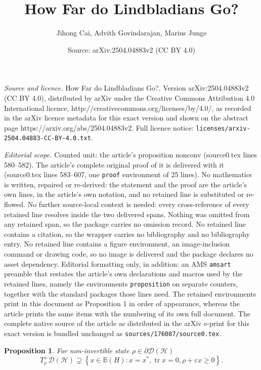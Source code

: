 \documentclass[10pt,a4paper]{amsart}
\title{How Far do Lindbladians Go?}
\author{Jihong Cai, Advith Govindarajan, Marius Junge}
\date{Source: arXiv:2504.04883v2 (CC BY 4.0)}
\newtheorem{proposition}{Proposition}
\newcommand{\lset}{\left\{ }
\newcommand{\rset}{\right\} }
\newcommand{\mb}{\mathbb}
\newcommand{\mc}{\mathcal}
\DeclareMathOperator{\tr}{tr}
\begin{document}
\maketitle

\noindent\emph{Source and licence.} How Far do Lindbladians Go?. Version arXiv:2504.04883v2 (CC BY 4.0), distributed by arXiv under the Creative Commons Attribution 4.0 International licence, http://creativecommons.org/licenses/by/4.0/, as recorded in the arXiv licence metadata for this exact version and shown on the abstract page https://arxiv.org/abs/2504.04883v2. Full licence notice: \texttt{licenses/arxiv-2504.04883-CC-BY-4.0.txt}.\par\smallskip

\noindent\textit{Editorial scope.} Counted unit: the article's proposition nonconv (source0.tex lines 580--582). The article's complete original proof of it is delivered with it (source0.tex lines 583--607, one \texttt{proof} environment of 25 lines). No mathematics is written, repaired or re-derived: the statement and the proof are the article's own lines, in the article's own notation, and no retained line is substituted or re-flowed.  No further source-local context is needed: every cross-reference of every retained line resolves inside the two delivered spans.  Nothing was omitted from any retained span, so the package carries no omission record.  No retained line contains a citation, so the wrapper carries no bibliography and no bibliography entry.  No retained line contains a figure environment, an image-inclusion command or drawing code, so no image is delivered and the package declares no asset dependency.  Editorial formatting only, in addition: an AMS \texttt{amsart} preamble that restates the article's own declarations and macros used by the retained lines, namely the environments \texttt{proposition} on separate counters, together with the standard packages those lines need.  The retained environments print in this document as Proposition 1 in order of appearance, whereas the article prints the same items with the numbering of its own full document.  The complete native source of the article as distributed in the arXiv e-print for this exact version is bundled unchanged as \texttt{sources/176087/source0.tex}.
\begin{proposition}  \label{nonconv} For non-invertible state $\rho \in \partial \mc D(\mc{H})$
    $$T^+_\rho \mc D(\mc{H})\supsetneq \lset x\in\mb B(H): x=x^*, \tr x=0, \rho+\varepsilon x\geq 0\rset.$$
\end{proposition}
\end{document}
